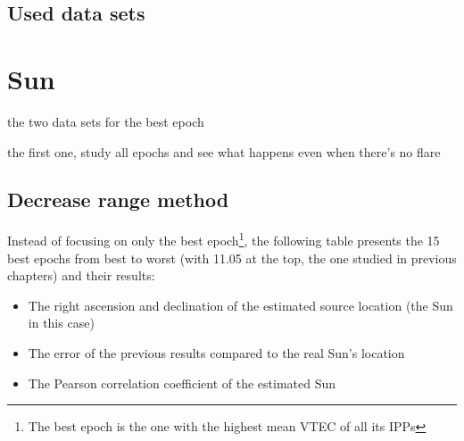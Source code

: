 \subsection{Used data sets}








\clearpage
\clearpage

\section{Sun}

the two data sets for the best epoch

the first one, study all epochs and see what happens even when there's no flare

\subsection{Decrease range method}

Instead of focusing on only the best epoch\footnote{The best epoch is the one with the highest mean VTEC of all its IPPs}, the following table presents the 15 best epochs from best to worst (with 11.05 at the top, the one studied in previous chapters) and their results: 

\begin{itemize}
	\item The right ascension and declination of the estimated source location (the Sun in this case)
	\item The error of the previous results compared to the real Sun's location
	\item The Pearson correlation coefficient of the estimated Sun
\end{itemize}

